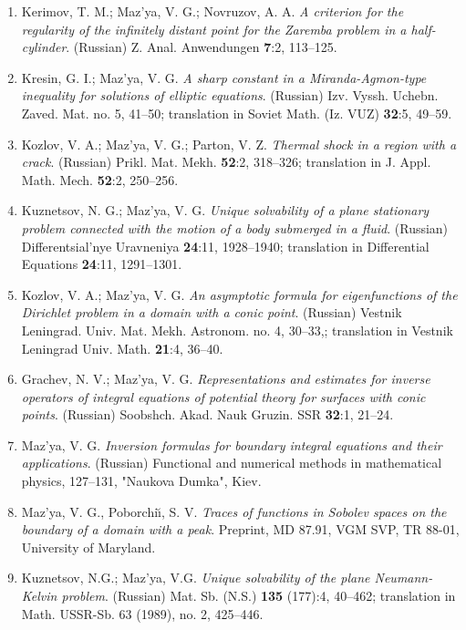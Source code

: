 \documentclass{article}
\begin{document}
\begin{enumerate}
\item Kerimov, T. M.; Maz'ya, V. G.; Novruzov, A. A. {\it A criterion
for
the regularity of the infinitely
distant point for the Zaremba problem in a half-cylinder}. (Russian)
Z.
Anal. Anwendungen {\bf 7}:2, 113--125.
\item Kresin, G. I.; Maz'ya, V. G. {\it A sharp constant in a
Miranda-Agmon-type inequality for solutions of elliptic
equations}. (Russian) Izv. Vyssh. Uchebn. Zaved. Mat. no. 5, 41--50;
translation in Soviet Math. (Iz. VUZ) {\bf 32}:5,
49--59.
\item Kozlov, V. A.; Maz'ya, V. G.; Parton, V. Z. {\it Thermal shock
in a
region with a crack}.
(Russian) Prikl. Mat. Mekh. {\bf 52}:2, 318--326; translation in J.
Appl.
Math. Mech. {\bf 52}:2, 250--256.
\item Kuznetsov, N. G.; Maz'ya, V. G. {\it Unique solvability of a
plane
stationary problem connected with the motion of a
body submerged in a fluid}. (Russian) Differentsial'nye Uravneniya
{\bf
24}:11, 1928--1940; translation in
Differential Equations {\bf 24}:11, 1291--1301.
\item Kozlov, V. A.; Maz'ya, V. G. {\it An asymptotic formula for
eigenfunctions of the Dirichlet problem in a
domain with a conic point}. (Russian) Vestnik Leningrad. Univ. Mat.
Mekh.
Astronom. no. 4, 30--33,; translation in
Vestnik Leningrad Univ. Math. {\bf 21}:4, 36--40.
\item Grachev, N. V.; Maz'ya, V. G. {\it Representations and estimates
for
inverse operators of integral
equations of potential theory for surfaces with conic points}.
(Russian)
Soobshch. Akad. Nauk Gruzin. SSR {\bf 32}:1,
21--24.
\item Maz'ya, V. G. {\it Inversion formulas for boundary integral
equations
and their applications}.
(Russian) Functional and numerical methods in mathematical physics,
127--131, "Naukova Dumka", Kiev.
\item Maz'ya, V. G., Poborchi{\u\i}, S. V. {\it Traces of functions in
Sobolev spaces on the boundary of a domain with a peak}.
Preprint, MD 87.91, VGM SVP, TR 88-01, University of Maryland.
\item Kuznetsov, N.G.; Maz'ya, V.G. {\it Unique solvability of the
plane
Neumann-Kelvin problem}. (Russian) Mat. Sb. (N.S.) {\bf 135} (177):4,
40--462;
translation in Math. USSR-Sb. 63 (1989), no. 2, 425--446. \hfill\break


\end{enumerate}
\end{document}
